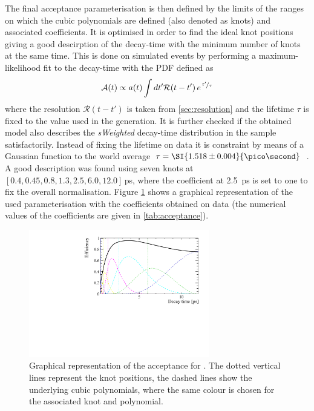 The final acceptance parameterisation is then defined by the limits of the ranges on which the cubic polynomials are defined (also denoted as knots) and associated coefficients.
It is optimised in order to find the ideal knot positions giving a good descirption of the decay-time with the minimum number of knots at the same time.
This is done on simulated events by performing a maximum-likelihood fit to the decay-time with the PDF defined as
\begin{equation}
\mathcal{A}(t)\propto a(t)\int dt' \mathcal{R}\!\left(t-t'\right)e^{\,\nicefrac{t'}{\tau}}
\end{equation}
where the resolution $\mathcal{R}\!\left(t-t'\right)$ is taken from \cref{sec:resolution} and the lifetime $\tau$ is fixed to the value used in the generation.
It is further checked if the obtained model also describes the \emph{sWeighted} decay-time distribution in the \BdToDpi sample satisfactorily.
Instead of fixing the lifetime on data it is constraint by means of a Gaussian function to the world average $\tau=\SI{1.518\pm0.004}{\pico\second}$~\cite{PDG_2017}.
A good description was found using seven knots at $[0.4, 0.45, 0.8, 1.3, 2.5, 6.0, 12.0]\,$\si{\pico\second}, where the coefficient at \SI{2.5}{\pico\second} is set to one to fix the overall normalisation.
Figure \ref{fig:acceptance} shows a graphical representation of the used parameterisation with the coefficients obtained on \BdToDpi data (the numerical values of the coefficients are given in \cref{tab:acceptance}).
\begin{figure}[tbp]
    \centering
    \includegraphics[width=0.7\textwidth]{09TimeFit/figs/Acceptance.pdf}
    \caption{Graphical representation of the acceptance for \BdToDpi.
    The dotted vertical lines represent the knot positions, the dashed lines show the underlying cubic polynomials, where the same colour is chosen for the associated knot and polynomial.}
    \label{fig:acceptance}
\end{figure}
